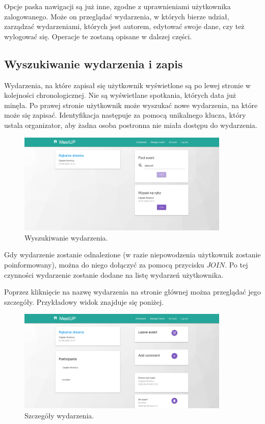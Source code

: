 \documentclass[12pt]{article}
\begin{document}
Opcje paska nawigacji są już inne, zgodne z uprawnieniami użytkownika zalogowanego. Może on przeglądać wydarzenia, w których bierze udział, zarządzać wydarzeniami, których jest autorem, edytować swoje dane, czy też wylogować się. Operacje te zostaną opisane w dalszej części.

\subsection{Wyszukiwanie wydarzenia i zapis}
Wydarzenia, na które zapisał się użytkownik wyświetlone są po lewej stronie w kolejności chronologicznej. Nie są wyświetlane spotkania, których data już minęła. Po prawej stronie użytkownik może wyszukać nowe wydarzenia, na które może się zapisać. Identyfikacja następuje za pomocą unikalnego klucza, który ustala organizator, aby żadna osoba postronna nie miała dostępu do wydarzenia.

\begin{figure}[H]
\centering
\includegraphics[width=0.9\textwidth]{meetup_find_event.png}
\caption{Wyszukiwanie wydarzenia.}
\end{figure}

Gdy wydarzenie zostanie odnalezione (w razie niepowodzenia użytkownik zostanie poinformowany), można do niego dołączyć za pomocą przycisku $JOIN$. Po tej czynności wydarzenie zostanie dodane na listę wydarzeń użytkownika.

Poprzez kliknięcie na nazwę wydarzenia na stronie głównej można przeglądać jego szczegóły. Przykładowy widok znajduje się poniżej.

\begin{figure}[H]
\centering
\includegraphics[width=0.9\textwidth]{meetup_event_details.png}
\caption{Szczegóły wydarzenia.}
\end{figure}
\end{document}
